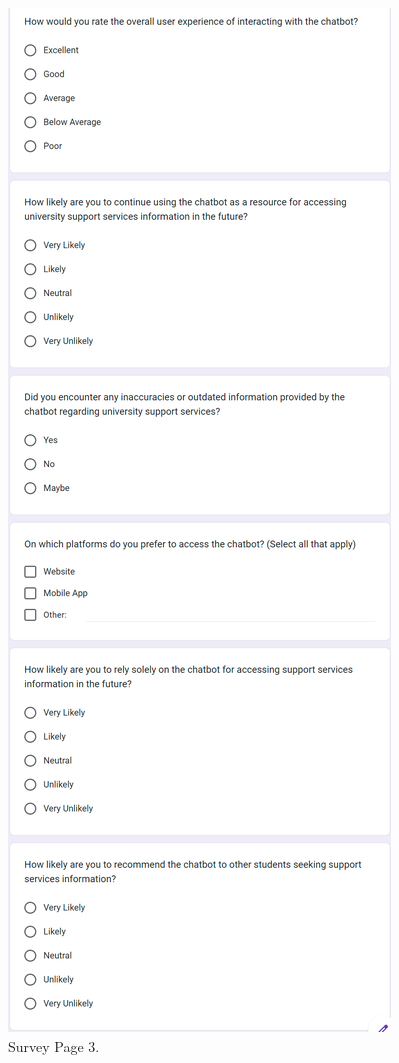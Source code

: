 \documentclass{l4proj}
\begin{document}
\begin{appendices}
\begin{figure}[h!]
  \centering
  \begin{adjustbox}{center,max height=0.77\textheight, max width=\linewidth}
    \includegraphics{images/survey3.png}
  \end{adjustbox}
  \caption{Survey Page 3.}
  \label{fig: Survey Page 1}
\end{figure}
\clearpage %


\end{appendices}
\end{document}
